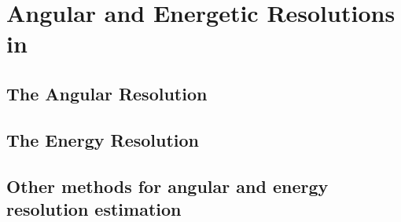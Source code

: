 

\chapter{Angular and Energetic Resolutions in \MAGIC}
\label{chapter:resol}

\section{The Angular Resolution}

\section{The Energy Resolution}

\section{Other methods for angular and energy resolution estimation}

\endinput
%

